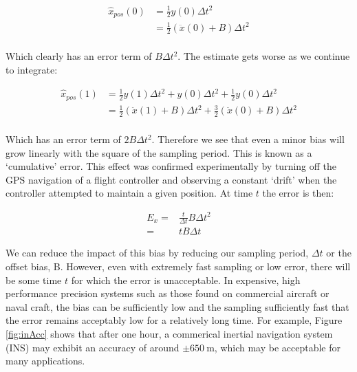 \documentclass[capstone_report.tex]{subfiles}
\begin{document}
\begin{align*}
	\hat{x}_{pos}(0)&=\frac{1}{2}y(0)\Delta t^2\\
	&=\frac{1}{2}(\ddot{x}(0)+B)\Delta t^2\\
\end{align*}

Which clearly has an error term of $B\Delta t^2$. The estimate gets worse as we continue to integrate:

\begin{align*}
\hat{x}_{pos}(1)&=\frac{1}{2}y(1)\Delta t^2+y(0)\Delta t^2+\frac{1}{2}y(0)\Delta t^2\\
&=\frac{1}{2}(\ddot{x}(1)+B)\Delta t^2+\frac{3}{2}(\ddot{x}(0)+B)\Delta t^2\\   	
\end{align*}

Which has an error term of $2B\Delta t^2$. Therefore we see that even a minor bias will grow linearly with the square of the sampling period. This is known as a `cumulative' error. This effect was confirmed experimentally by turning off the GPS navigation of a flight controller and observing a constant `drift' when the controller attempted to maintain a given position. At time $t$ the error is then:

\begin{align*} 
	E_x=&\frac{t}{\Delta t}B\Delta t^2\\
	=&tB\Delta t
\end{align*}

We can reduce the impact of this bias by reducing our sampling period, $\Delta t$ or the offset bias, B. However, even with extremely fast sampling or low error, there will be some time $t$ for which the error is unacceptable. In expensive, high performance precision systems such as those found on commercial aircraft or naval craft, the bias can be sufficiently low and the sampling sufficiently fast that the error remains acceptably low for a relatively long time. For example, Figure \ref{fig:inAcc} shows that after one hour, a commerical inertial navigation system (INS) may exhibit an accuracy of around $\pm \SI{650}{\meter}$, which may be acceptable for many applications.\\
\end{document}
